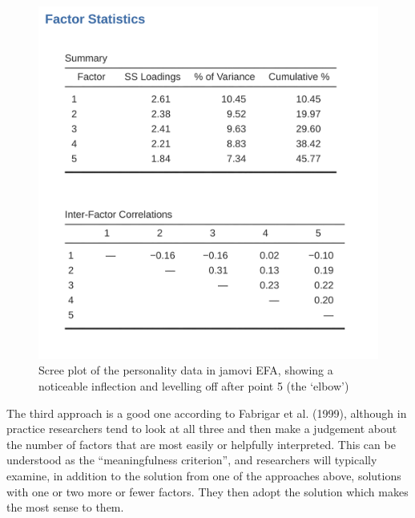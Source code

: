 \documentclass[
  a4paper,
]{book}
\begin{document}
\begin{figure}

\includegraphics[width=1\textwidth,height=\textheight]{images/fig15-5.png} \hfill{}

\caption{\label{fig-fig15-5}Scree plot of the personality data in jamovi
EFA, showing a noticeable inflection and levelling off after point 5
(the `elbow')}

\end{figure}

The third approach is a good one according to Fabrigar et al. (1999),
although in practice researchers tend to look at all three and then make
a judgement about the number of factors that are most easily or
helpfully interpreted. This can be understood as the ``meaningfulness
criterion'', and researchers will typically examine, in addition to the
solution from one of the approaches above, solutions with one or two
more or fewer factors. They then adopt the solution which makes the most
sense to them.
\end{document}
